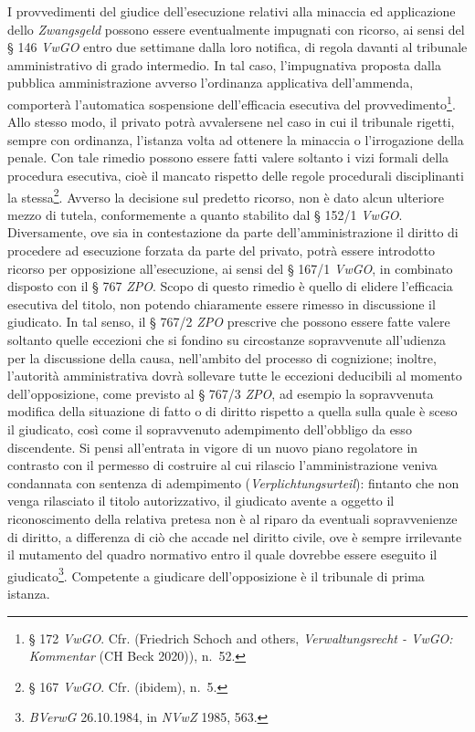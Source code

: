 \documentclass[12pt,it,a4paper,]{report}
\begin{document}
I provvedimenti del giudice dell'esecuzione relativi alla minaccia ed
applicazione dello \emph{Zwangsgeld} possono essere eventualmente
impugnati con ricorso, ai sensi del § 146 \emph{VwGO} entro due
settimane dalla loro notifica, di regola davanti al tribunale
amministrativo di grado intermedio. In tal caso, l'impugnativa proposta
dalla pubblica amministrazione avverso l'ordinanza applicativa
dell'ammenda, comporterà l'automatica sospensione dell'efficacia
esecutiva del provvedimento\footnote{§ 172 \emph{VwGO}. Cfr. (Friedrich
  Schoch and others, \emph{Verwaltungsrecht - VwGO: Kommentar} (CH Beck
  2020)), n.~52.}. Allo stesso modo, il privato potrà avvalersene nel
caso in cui il tribunale rigetti, sempre con ordinanza, l'istanza volta
ad ottenere la minaccia o l'irrogazione della penale. Con tale rimedio
possono essere fatti valere soltanto i vizi formali della procedura
esecutiva, cioè il mancato rispetto delle regole procedurali
disciplinanti la stessa\footnote{§ 167 \emph{VwGO}. Cfr. (ibidem), n.~5.}.
Avverso la decisione sul predetto ricorso, non è dato alcun ulteriore
mezzo di tutela, conformemente a quanto stabilito dal § 152/1
\emph{VwGO}. Diversamente, ove sia in contestazione da parte
dell'amministrazione il diritto di procedere ad esecuzione forzata da
parte del privato, potrà essere introdotto ricorso per opposizione
all'esecuzione, ai sensi del § 167/1 \emph{VwGO}, in combinato disposto
con il § 767 \emph{ZPO}. Scopo di questo rimedio è quello di elidere
l'efficacia esecutiva del titolo, non potendo chiaramente essere rimesso
in discussione il giudicato. In tal senso, il § 767/2 \emph{ZPO}
prescrive che possono essere fatte valere soltanto quelle eccezioni che
si fondino su circostanze sopravvenute all'udienza per la discussione
della causa, nell'ambito del processo di cognizione; inoltre, l'autorità
amministrativa dovrà sollevare tutte le eccezioni deducibili al momento
dell'opposizione, come previsto al § 767/3 \emph{ZPO}, ad esempio la
sopravvenuta modifica della situazione di fatto o di diritto rispetto a
quella sulla quale è sceso il giudicato, così come il sopravvenuto
adempimento dell'obbligo da esso discendente. Si pensi all'entrata in
vigore di un nuovo piano regolatore in contrasto con il permesso di
costruire al cui rilascio l'amministrazione veniva condannata con
sentenza di adempimento (\emph{Verplichtungsurteil}): fintanto che non
venga rilasciato il titolo autorizzativo, il giudicato avente a oggetto
il riconoscimento della relativa pretesa non è al riparo da eventuali
sopravvenienze di diritto, a differenza di ciò che accade nel diritto
civile, ove è sempre irrilevante il mutamento del quadro normativo entro
il quale dovrebbe essere eseguito il giudicato\footnote{\emph{BVerwG}
  26.10.1984, in \emph{NVwZ} 1985, 563.}. Competente a giudicare
dell'opposizione è il tribunale di prima istanza.
\end{document}
